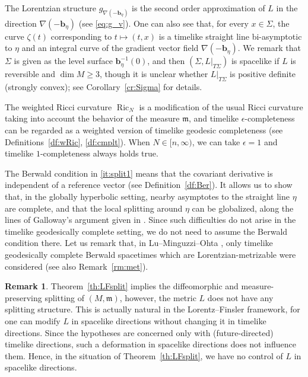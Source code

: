 \documentclass[a4paper,11pt]{article}
\numberwithin{equation}{section}
\theoremstyle{definition}
\newtheorem{remark}[definition]{Remark}
\theoremstyle{plain}
\newcommand{\ez}{\epsilon}
\newcommand{\fm}{\ensuremath{\mathfrak{m}}}
\newcommand{\bb}{\ensuremath{\mathbf{b}}}
\def\Ric{\mathop{\mathrm{Ric}}\nolimits}
\begin{document}
The Lorentzian structure $g_{\nabla(-\bb_\eta)}$ is the second order approximation of $L$ in the direction $\nabla(-\bb_\eta)$ (see \eqref{eq:g_v}).
One can also see that, for every $x \in \Sigma$, the curve $\zeta(t)$ corresponding to $t \longmapsto (t,x)$ is a timelike straight line bi-asymptotic to $\eta$ and an integral curve of the gradient vector field $\nabla(-\bb_\eta)$.
We remark that $\Sigma$ is given as the level surface $\bb_\eta^{-1}(0)$, and then $(\Sigma,L|_{T\Sigma})$ is spacelike if $L$ is reversible and $\dim M \ge 3$, though it is unclear whether $L|_{T\Sigma}$ is positive definite (strongly convex); see Corollary~\ref{cr:Sigma} for details.

The weighted Ricci curvature $\Ric_N$ is a modification of the usual Ricci curvature taking into account the behavior of the measure $\fm$, and timelike $\ez$-completeness can be regarded as a weighted version of timelike geodesic completeness (see Definitions~\ref{df:wRic}, \ref{df:cmplt}).
When $N \in [n,\infty)$, we can take $\ez=1$ and timelike $1$-completeness always holds true.

The Berwald condition in \eqref{it:split1} means that the covariant derivative is independent of a reference vector (see Definition~\ref{df:Ber}).
It allows us to show that, in the globally hyperbolic setting, nearby asymptotes to the straight line $\eta$ are complete, and that the local splitting around $\eta$ can be globalized, along the lines of Galloway's argument given in \cite{Galloway:89}.
Since such difficulties do not arise in the timelike geodesically complete setting, we do not need to assume the Berwald condition there.
Let us remark that, in Lu--Minguzzi--Ohta \cite[Theorem~1.2]{LMO3}, only timelike geodesically complete Berwald spacetimes which are Lorentzian-metrizable were considered (see also Remark~\ref{rm:met}).

\begin{remark}\label{rm:split}
Theorem~\ref{th:LFsplit} implies the diffeomorphic and measure-preserving splitting of $(M,\fm)$, however, the metric $L$ does not have any splitting structure.
This is actually natural in the Lorentz--Finsler framework, for one can modify $L$ in spacelike directions without changing it in timelike directions.  Since the hypotheses are concerned only with (future-directed) timelike directions, such a deformation in spacelike directions does not influence them.
Hence, in the situation of Theorem~\ref{th:LFsplit}, we have no control of $L$ in spacelike directions.
\end{remark}
\end{document}
